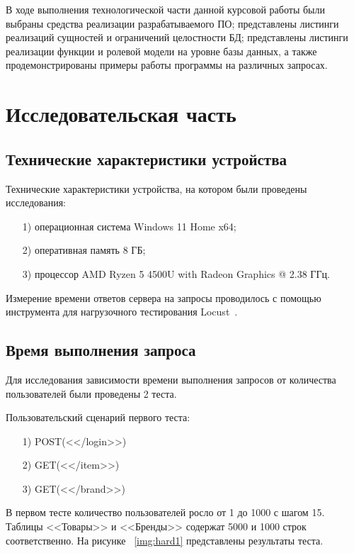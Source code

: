 \documentclass{bmstu}
\begin{document}
В ходе выполнения технологической части данной курсовой работы были выбраны средства реализации разрабатываемого ПО; представлены листинги реализаций сущностей и ограничений целостности БД; представлены листинги реализации функции и ролевой модели на уровне базы данных, а также продемонстрированы примеры работы программы на различных запросах.

\chapter{Исследовательская часть}

\section{Технические характеристики устройства}

Технические характеристики устройства, на котором были проведены исследования:

\begin{enumerate}
\item[1)]
операционная система Windows 11 Home x64;
\item[2)]
оперативная память 8 ГБ;
\item[3)]
процессор AMD Ryzen 5 4500U with Radeon Graphics @ 2.38 ГГц.
\end{enumerate}

Измерение времени ответов сервера на запросы проводилось с помощью инструмента для нагрузочного тестирования Locust~\cite{Locust}.

\section{Время выполнения запроса}

Для исследования зависимости времени выполнения запросов от количества пользователей были проведены 2 теста.

Пользовательский сценарий первого теста:

\begin{enumerate}
	\item[1)]
	POST(<</login>>)
	\item[2)]
	GET(<</item>>)
	\item[3)]
	GET(<</brand>>)
\end{enumerate}

В первом тесте количество пользователей росло от 1 до 1000 с шагом 15. Таблицы <<Товары>> и <<Бренды>> содержат 5000 и 1000 строк соответственно. На рисунке ~\ref{img:hard1} представлены результаты теста.
\end{document}
